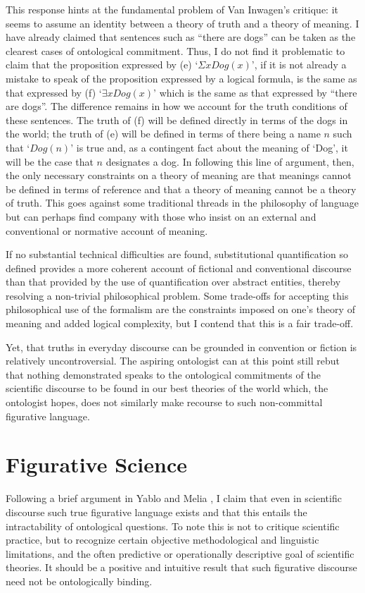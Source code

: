 \documentclass[12pt,letterpaper]{article}
\begin{document}
\begin{doublespace}
This response hints at the fundamental problem of Van Inwagen's
critique: it seems to assume an identity between a theory of truth and
a theory of meaning. I have already claimed that sentences such as
``there are dogs'' can be taken as the clearest cases of ontological
commitment.  Thus, I do not find it problematic to claim that the
proposition expressed by (e) `$\Sigma xDog(x)$', if it is not already
a mistake to speak of the proposition expressed by a logical formula,
is the same as that expressed by (f) `$\exists xDog(x)$' which is the
same as that expressed by ``there are dogs''.  The difference remains
in how we account for the truth conditions of these sentences.  The
truth of (f) will be defined directly in terms of the dogs in the
world; the truth of (e) will be defined in terms of there being a name
$n$ such that `$Dog(n)$' is true and, as a contingent fact about the
meaning of `Dog', it will be the case that $n$ designates a dog.  In
following this line of argument, then, the only necessary constraints
on a theory of meaning are that meanings cannot be defined in terms of
reference and that a theory of meaning cannot be a theory of
truth. This goes against some traditional threads in the philosophy of
language but can perhaps find company with those who insist on an
external and conventional or normative account of meaning.

If no substantial technical difficulties are found, substitutional
quantification so defined provides a more coherent account of
fictional and conventional discourse than that provided by the use of
quantification over abstract entities, thereby resolving a non-trivial
philosophical problem. Some trade-offs for accepting this
philosophical use of the formalism are the constraints imposed on
one's theory of meaning and added logical complexity, but I contend
that this is a fair trade-off. 

Yet, that truths in everyday discourse can be grounded in convention
or fiction is relatively uncontroversial. The aspiring ontologist can
at this point still rebut that nothing demonstrated speaks to the
ontological commitments of the scientific discourse to be found in our
best theories of the world which, the ontologist hopes, does not
similarly make recourse to such non-committal figurative language.


\section{Figurative Science}
Following a brief argument in Yablo \cite{yablo} and Melia
\cite{melia}, I claim that even in scientific discourse such true
figurative language exists and that this entails the intractability of
ontological questions. To note this is not to critique scientific
practice, but to recognize certain objective methodological and
linguistic limitations, and the often predictive or operationally
descriptive goal of scientific theories. It should be a positive and
intuitive result that such figurative discourse need not be
ontologically binding.


\end{doublespace}
\end{document}
